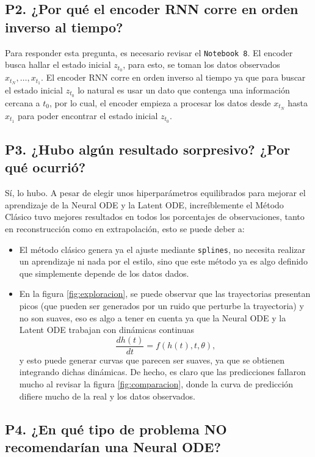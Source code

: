 \documentclass[11pt,letterpaper]{article}
\begin{document}
\subsection*{P2. ¿Por qué el encoder RNN corre en orden inverso al tiempo?}

Para responder esta pregunta, es necesario revisar el \texttt{Notebook 8}. El encoder busca hallar el estado inicial $z_{t_0}$, para esto, se toman los datos observados $x_{t_N},\dots, x_{t_1}$. El encoder RNN corre en orden inverso al tiempo ya que para buscar el estado inicial $z_{t_0}$ lo natural es usar un dato que contenga una información cercana a $t_0$, por lo cual, el encoder empieza a procesar los datos desde $x_{t_N}$ hasta $x_{t_1}$ para poder encontrar el estado inicial $z_{t_0}$.

\subsection*{P3. ¿Hubo algún resultado sorpresivo? ¿Por qué ocurrió?}

Sí, lo hubo. A pesar de elegir unos hiperparámetros equilibrados para mejorar el aprendizaje de la Neural ODE y la Latent ODE, increíblemente el Método Clásico tuvo mejores resultados en todos los porcentajes de observaciones, tanto en reconstrucción como en extrapolación, esto se puede deber a:
\begin{itemize}[leftmargin=0.5cm]
    \item El método clásico genera ya el ajuste mediante \texttt{splines}, no necesita realizar un aprendizaje ni nada por el estilo, sino que este método ya es algo definido que simplemente depende de los datos dados.
    \item En la figura \ref{fig:exploracion}, se puede observar que las trayectorias presentan picos (que pueden ser generados por un ruido que perturbe la trayectoria) y no son suaves, eso es algo a tener en cuenta ya que la Neural ODE y la Latent ODE trabajan con dinámicas continuas
    $$\frac{dh(t)}{dt}=f(h(t),t,\theta),$$
    y esto puede generar curvas que parecen ser suaves, ya que se obtienen integrando dichas dinámicas. De hecho, es claro que las predicciones fallaron mucho al revisar la figura \ref{fig:comparacion}, donde la curva de predicción difiere mucho de la real y los datos observados.
\end{itemize}

\subsection*{P4. ¿En qué tipo de problema NO recomendarían una Neural ODE?}
\end{document}
